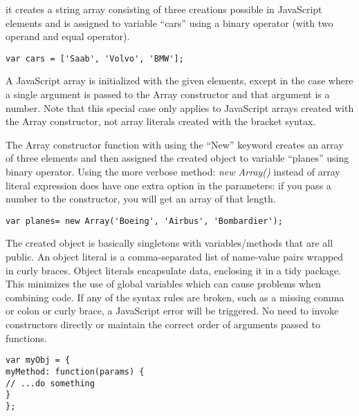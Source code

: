 
it creates a string array consisting of three creations possible in JavaScript elements and is assigned to variable “cars” using a binary operator (with two operand and equal operator). 
\medskip
\begin{lstlisting}[caption=Array literal expression]
var cars = ['Saab', 'Volvo', 'BMW'];
\end{lstlisting}
A JavaScript array is initialized with the given elements, except in the case where a single argument is passed to the Array constructor and that argument is a number. Note that this special case only applies to JavaScript arrays created with the Array constructor, not array literals created with the bracket syntax.
\\
\break
{}
\vspace{1mm}

The Array constructor function with using the “New” keyword creates an array of three elements and then assigned the created object to variable “planes” using binary operator. Using the more verbose method: \textit{new Array()} instead of array literal expression does have one extra option in the parameters: if you pass a number to the constructor, you will get an array of that length. 

\medskip
\begin{lstlisting}[caption=Array constructor]
var planes= new Array('Boeing', 'Airbus', 'Bombardier');
\end{lstlisting}



The created object is basically singletons with variables/methods that are all public. An object literal is a comma-separated list of name-value pairs wrapped in curly braces. Object literals encapsulate data, enclosing it in a tidy package. This minimizes the use of global variables which can cause problems when combining code. If any of the syntax rules are broken, such as a missing comma or colon or curly brace, a JavaScript error will be triggered. No need to invoke constructors directly or maintain the correct order of arguments passed to functions. 
\begin{lstlisting}[caption=Object literal expression]
var myObj = {
myMethod: function(params) {
// ...do something
}
};

\end{lstlisting}


